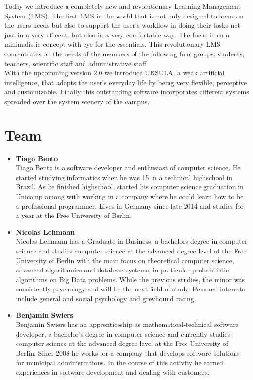 \documentclass{article}
\begin{document}
Today we introduce a completely new and revolutionary Learning Management System (LMS). The first LMS in the world that is not only designed to focus on the users needs but also to support the user's workflow in doing their tasks not just in a very efficent, but also in a very comfortable way. The focus is on a minimalistic concept with eye for the essentials. This revolutionary LMS concentrates on the needs of the members of the following four groups: students, teachers, scientific staff and administrative staff\\
With the upcomming version 2.0 we introduce URSULA, a weak artificial intelligence, that adapts the user's  everyday life by being very flexible, perceptive and customizable. Finally this outstanding software incorporates different systems spreaded over the system scenery of the campus.

\section{Team}

\begin{itemize}
\item \textbf{Tiago Bento}\\
Tiago Bento is a software developer and enthusiast of computer science. He started studying informatics when he was 15 in a technical highschool in Brazil. As he finished highschool, started his computer science graduation in Unicamp among with working in a company where he could learn how to be a professional programmer. Lives in Germany since late 2014 and studies for a year at the Free University of Berlin.
\item \textbf{Nicolas Lehmann}\\
Nicolas Lehmann has a Graduate in Business, a bachelors degree in computer science and studies computer science at the advanced degree level at the Free University of Berlin with the main focus on theoretical computer science, advanced algorithmics and database systems, in particular probabilistic algorithms on Big Data problems. While the previous studies, the minor was consistently psychology and will be the next field of study. Personal interests include general and social psychology and greyhound racing.
\item \textbf{Benjamin Swiers}\\
Benjamin Swiers has an apprenticeship as mathematical-technical software developer, a bachelor's degree in computer science and currently studies computer science at the advanced degree level at the Free University of Berlin. Since 2008 he works for a company that develops software solutions for municipal administrations. In the course of this activity he earned experiences in software development and dealing with customers.
\end{itemize}
\end{document}
